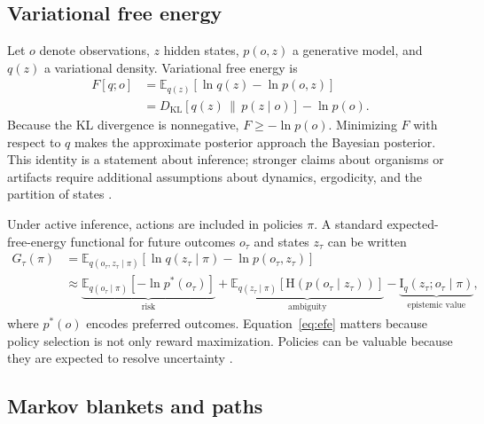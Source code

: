\documentclass[11pt,a4paper]{article}
\numberwithin{equation}{section}
\newcommand{\KL}{D_{\mathrm{KL}}}
\newcommand{\Hent}{\mathrm{H}}
\newcommand{\MI}{\mathrm{I}}
\newcommand{\E}{\mathbb{E}}
\begin{document}
\subsection{Variational free energy}

Let $o$ denote observations, $z$ hidden states, $p(o,z)$ a generative model,
and $q(z)$ a variational density. Variational free energy is
\begin{align}
  F[q;o]
  &= \E_{q(z)}[\ln q(z)-\ln p(o,z)] \\
  &= \KL\!\left[q(z)\,\|\,p(z\mid o)\right]-\ln p(o).
  \label{eq:vfe}
\end{align}
Because the KL divergence is nonnegative, $F\ge -\ln p(o)$. Minimizing $F$
with respect to $q$ makes the approximate posterior approach the Bayesian
posterior. This identity is a statement about inference; stronger claims
about organisms or artifacts require additional assumptions about dynamics,
ergodicity, and the partition of states \cite{friston2010,friston2019,
millidge2021,parr2022,buckley2017,clark2017}.

Under active inference, actions are included in policies $\pi$. A standard
expected-free-energy functional for future outcomes $o_\tau$ and states
$z_\tau$ can be written
\begin{align}
  G_\tau(\pi)
  &= \E_{q(o_\tau,z_\tau\mid\pi)}
     [\ln q(z_\tau\mid\pi)-\ln p(o_\tau,z_\tau)] \\
  &\approx
  \underbrace{\E_{q(o_\tau\mid\pi)}[-\ln p^*(o_\tau)]}_{\text{risk}}
  +\underbrace{\E_{q(z_\tau\mid\pi)}
    [\Hent(p(o_\tau\mid z_\tau))]}_{\text{ambiguity}}
  -\underbrace{\MI_q(z_\tau;o_\tau\mid\pi)}_{\text{epistemic value}},
  \label{eq:efe}
\end{align}
where $p^*(o)$ encodes preferred outcomes. Equation~\eqref{eq:efe} matters
because policy selection is not only reward maximization. Policies can be
valuable because they are expected to resolve uncertainty
\cite{parrfriston2017,dacosta2020,parr2022,friston2015efe,
friston2017process,pezzulo2015,tschantz2020}.

\subsection{Markov blankets and paths}
\end{document}
